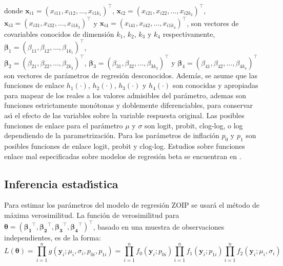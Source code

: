 donde $\mathbf{x}_{i1}=(x_{i11}, x_{i12},\ldots, x_{i1k_1})^{\top}$, $\mathbf{x}_{i2}=(x_{i21}, x_{i22},\ldots, x_{i2k_2})^{\top}$, \\
$\mathbf{x}_{i3}=(x_{i31}, x_{i32},\ldots, x_{i1k_3})^{\top}$ y $\mathbf{x}_{i4}=(x_{i41}, x_{i42},\ldots, x_{i1k_4})^{\top}$, son vectores de covariables conocidos de dimensi\'{o}n $k_1$, $k_2$, $k_3$ y $k_4$ respectivamente, $\boldsymbol{\beta}_1=(\beta_{11}, \beta_{12},\ldots, \beta_{1k_1})^{\top}$, \\
$\boldsymbol{\beta}_2=(\beta_{21}, \beta_{22},\ldots, \beta_{2k_2})^{\top}$, $\boldsymbol{\beta}_3=(\beta_{31}, \beta_{32},\ldots, \beta_{3k_3})^{\top}$ y $\boldsymbol{\beta}_4=(\beta_{41}, \beta_{42},\ldots, \beta_{4k_4})^{\top}$ son vectores de par\'{a}metros de regresi\'{o}n desconocidos. Adem\'{a}s, se asume que las funciones de enlace $h_1(\cdot)$, $h_2(\cdot)$, $h_3(\cdot)$ y $h_4(\cdot)$ son conocidas y apropiadas para mapear de los reales a los valores admisibles del par\'{a}metro, ademas son funciones estrictamente mon\'{o}tonas y doblemente diferenciables, para conservar as\'{\i} el efecto de las variables sobre la variable respuesta ori\-gi\-nal. Las posibles funciones de enlace para el par\'{a}metro $\mu$ y $\sigma$ son logit, probit, clog-log, o log dependiendo de la parametrizaci\'{o}n. Para los par\'{a}metros de inflaci\'{o}n $p_0$ y $p_1$ son posibles funciones de enlace logit, probit y clog-log. Estudios sobre funciones enlace mal especificadas sobre modelos de regresi\'{o}n beta se encuentran en \cite{andrade07}.

\subsection*{Inferencia estad\'{\i}stica}

Para estimar los par\'{a}metros del modelo de regresi\'{o}n ZOIP se usar\'{a} el m\'{e}todo de m\'{a}xima verosimilitud. La funci\'{o}n de verosimilitud para $\boldsymbol{\theta}=(\boldsymbol{\beta_1}^{\top},\boldsymbol{\beta_2}^{\top},\boldsymbol{\beta_3}^{\top}, \boldsymbol{\beta_4}^{\top})^{\top}$, basado en una muestra de observaciones independientes, es de la forma:
\begin{equation}
L(\boldsymbol{\theta})=\prod_{i=1}^{n}g(\mathbf{y}_i;\mu_i,\sigma_i,p_{0i},p_{1i})=\prod_{i=1}^{n}f_0(\mathbf{y}_i;p_{0i})\prod_{i=1}^{n}f_1(\mathbf{y}_i;p_{1i})\prod_{i=1}^{n}f_2(\mathbf{y}_i;\mu_i,\sigma_i)
\label{F_likel}
\end{equation}

